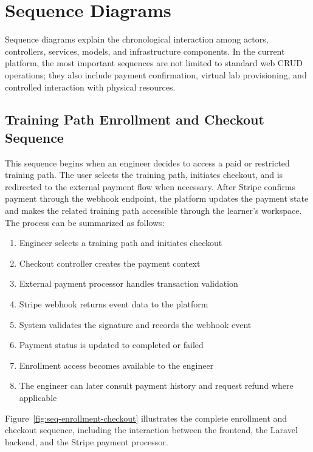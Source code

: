 \section{Sequence Diagrams}

Sequence diagrams explain the chronological interaction among actors,
controllers, services, models, and infrastructure components. In the current
platform, the most important sequences are not limited to standard web CRUD
operations; they also include payment confirmation, virtual lab provisioning,
and controlled interaction with physical resources.

\subsection{Training Path Enrollment and Checkout Sequence}

This sequence begins when an engineer decides to access a paid or restricted
training path. The user selects the training path, initiates checkout, and is
redirected to the external payment flow when necessary. After Stripe confirms
payment through the webhook endpoint, the platform updates the payment state
and makes the related training path accessible through the learner's workspace.
The process can be summarized as follows:

\begin{enumerate}[topsep=0pt,itemsep=1pt,parsep=0pt,partopsep=0pt]
    \item Engineer selects a training path and initiates checkout
    \item Checkout controller creates the payment context
    \item External payment processor handles transaction validation
    \item Stripe webhook returns event data to the platform
    \item System validates the signature and records the webhook event
    \item Payment status is updated to completed or failed
    \item Enrollment access becomes available to the engineer
    \item The engineer can later consult payment history and request refund where
          applicable \end{enumerate} Figure~\ref{fig:seq-enrollment-checkout} illustrates the complete enrollment and checkout sequence, including the interaction between the frontend, the Laravel backend, and the Stripe payment processor.

